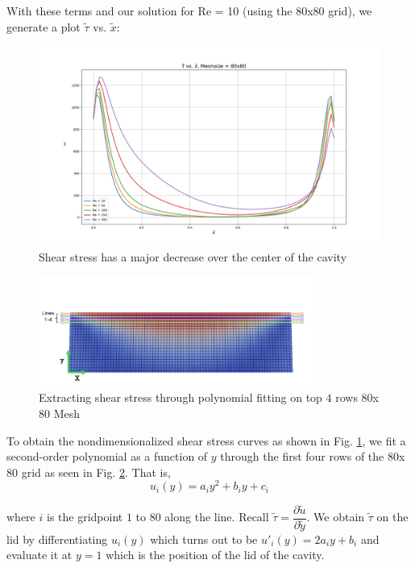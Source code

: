 \documentclass[11pt]{article}
\begin{document}
With these terms and our solution for Re = 10 (using the 80x80 grid), we generate a plot $\tilde{\tau}$ vs. $\tilde{x}$:
\begin{figure}[H]
   \centering
   \includegraphics[width = \textwidth]{images/Nondimensional_Stress_vs._x.png}
   \caption{Shear stress has a major decrease over the center of the cavity}
   \label{shear}
\end{figure}

\begin{figure}[H]
   \centering
   \includegraphics[width = 0.8\textwidth]{images/80mesh_extractingstress.png}
   \caption{Extracting shear stress through polynomial fitting on top $4$ rows $80$x$80$ Mesh}
   \label{80meshstress}
\end{figure}

To obtain the nondimensionalized shear stress curves as shown in Fig. \ref{shear}, we fit a second-order polynomial as a function of $y$ through the first four rows of the $80$x$80$ grid as seen in Fig. \ref{80meshstress}. That is,
\begin{equation*}
   u_{i}(y) = a_{i}y^{2} + b_{i}y + c_{i}
\end{equation*}
\vspace{1mm}

where $i$ is the gridpoint $1$ to $80$ along the line. Recall $\tilde{\tau} = \dfrac{\partial\tilde{u}}{\partial\tilde{y}}$. We obtain $\tilde{\tau}$ on the lid by differentiating $u_{i}(y)$ which turns out to be $u'_{i}(y) = 2a_{i}y + b_{i}$ and evaluate it at $y=1$ which is the position of the lid of the cavity. 
\vspace{1.5mm}
\end{document}
